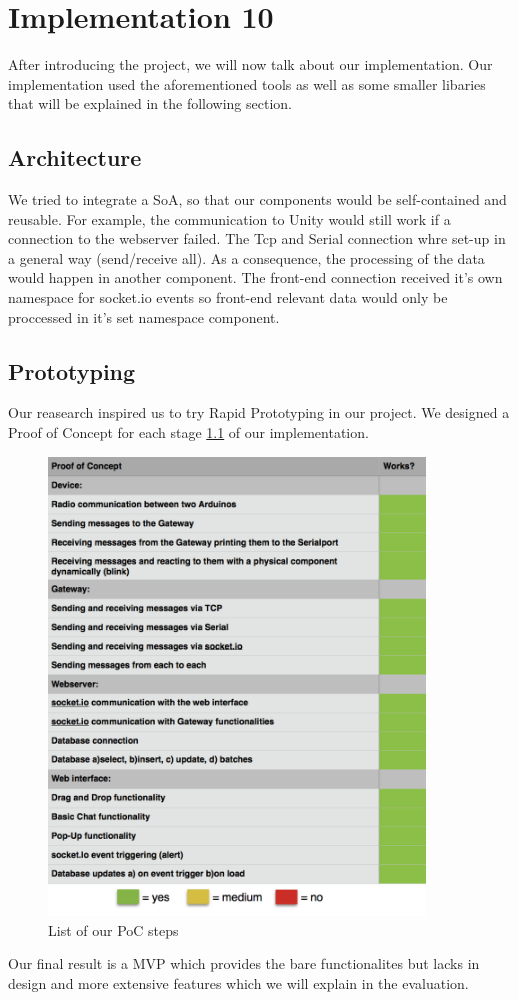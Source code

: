 
\chapter{Implementation 10} %
\label{Chapter3} %

After introducing the project, we will now talk about our implementation.
Our implementation used the aforementioned tools as well as some smaller libaries that will be explained in the following section.
\section{Architecture}
We tried to integrate a SoA, so that our components would be self-contained and reusable. 
For example, the communication to Unity would still work if a connection to the webserver failed.
The Tcp and Serial connection whre set-up in a general way (send/receive all). 
As a consequence, the processing of the data would happen in another component.
The front-end connection received it's own namespace for socket.io events so front-end relevant data 
would only be proccessed in it's set namespace component.
\section{Prototyping}
Our reasearch inspired us to try Rapid Prototyping in our project. 
We designed a Proof of Concept for each stage \ref{fig:PoC} of our implementation.
\begin{figure}[th]
	\centering
	\includegraphics[width=100mm,scale=1]{Figures/PoC}
	\decoRule
	\caption[PoC]{List of our PoC steps}
	\label{fig:PoC}
\end{figure}
Our final result is a MVP %
which provides the bare functionalites but lacks in design and more extensive features which we will explain in the evaluation.
